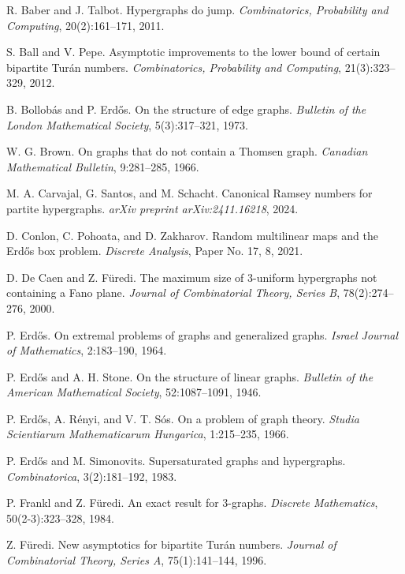 \documentclass[11pt,a4paper]{article}
\theoremstyle{definition}
\begin{document}
\begin{thebibliography}{99}

R. Baber and J. Talbot.
Hypergraphs do jump.
\textit{Combinatorics, Probability and Computing}, 20(2):161--171, 2011.

S. Ball and V. Pepe.
Asymptotic improvements to the lower bound of certain bipartite Turán numbers.
\textit{Combinatorics, Probability and Computing}, 21(3):323--329, 2012.

B. Bollobás and P. Erdős.
On the structure of edge graphs.
\textit{Bulletin of the London Mathematical Society}, 5(3):317–321, 1973.

W. G. Brown.
On graphs that do not contain a Thomsen graph.
\textit{Canadian Mathematical Bulletin}, 9:281--285, 1966.

M. A. Carvajal, G. Santos, and M. Schacht.
Canonical Ramsey numbers for partite hypergraphs.
\textit{arXiv preprint arXiv:2411.16218}, 2024.

D. Conlon, C. Pohoata, and D. Zakharov.
Random multilinear maps and the Erdős box problem.
\textit{Discrete Analysis}, Paper No. 17, 8, 2021.

D. De Caen and Z. Füredi.
The maximum size of 3-uniform hypergraphs not containing a Fano plane.
\textit{Journal of Combinatorial Theory, Series B}, 78(2):274--276, 2000.

P. Erdős.
On extremal problems of graphs and generalized graphs.
\textit{Israel Journal of Mathematics}, 2:183–190, 1964.

P. Erdős and A. H. Stone.
On the structure of linear graphs.
\textit{Bulletin of the American Mathematical Society}, 52:1087--1091, 1946.

P. Erdős, A. Rényi, and V. T. Sós.
On a problem of graph theory.
\textit{Studia Scientiarum Mathematicarum Hungarica}, 1:215--235, 1966.

P. Erdős and M. Simonovits.
Supersaturated graphs and hypergraphs.
\textit{Combinatorica}, 3(2):181--192, 1983.

P. Frankl and Z. Füredi.
An exact result for 3-graphs.
\textit{Discrete Mathematics}, 50(2-3):323--328, 1984.

Z. Füredi.
New asymptotics for bipartite Turán numbers.
\textit{Journal of Combinatorial Theory, Series A}, 75(1):141--144, 1996.


\end{thebibliography}
\end{document}
